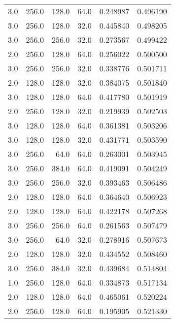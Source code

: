 \begin{longtable}{rrrrrr}
        3.0 &     256.0 &       128.0 &     64.0 &      0.248987 &    0.496190 \\
        3.0 &     256.0 &       128.0 &     32.0 &      0.445840 &    0.498205 \\
        3.0 &     256.0 &       256.0 &     32.0 &      0.273567 &    0.499422 \\
        2.0 &     256.0 &       128.0 &     64.0 &      0.256022 &    0.500500 \\
        3.0 &     256.0 &       256.0 &     32.0 &      0.338776 &    0.501711 \\
        2.0 &     128.0 &       128.0 &     32.0 &      0.384075 &    0.501840 \\
        3.0 &     128.0 &       128.0 &     64.0 &      0.417780 &    0.501919 \\
        2.0 &     256.0 &       128.0 &     32.0 &      0.219939 &    0.502503 \\
        3.0 &     128.0 &       128.0 &     64.0 &      0.361381 &    0.503206 \\
        3.0 &     128.0 &       128.0 &     32.0 &      0.431771 &    0.503590 \\
        3.0 &     256.0 &        64.0 &     64.0 &      0.263001 &    0.503945 \\
        3.0 &     256.0 &       384.0 &     64.0 &      0.419091 &    0.504249 \\
        3.0 &     256.0 &       256.0 &     32.0 &      0.393463 &    0.506486 \\
        2.0 &     128.0 &       128.0 &     64.0 &      0.364640 &    0.506923 \\
        2.0 &     128.0 &       128.0 &     64.0 &      0.422178 &    0.507268 \\
        3.0 &     256.0 &       256.0 &     64.0 &      0.261563 &    0.507479 \\
        3.0 &     256.0 &        64.0 &     32.0 &      0.278916 &    0.507673 \\
        2.0 &     128.0 &       128.0 &     32.0 &      0.434552 &    0.508460 \\
        3.0 &     256.0 &       384.0 &     32.0 &      0.439684 &    0.514804 \\
        1.0 &     256.0 &       128.0 &     64.0 &      0.334873 &    0.517134 \\
        2.0 &     128.0 &       128.0 &     64.0 &      0.465061 &    0.520224 \\
        2.0 &     256.0 &       128.0 &     64.0 &      0.195905 &    0.521330 \\

\end{longtable}
